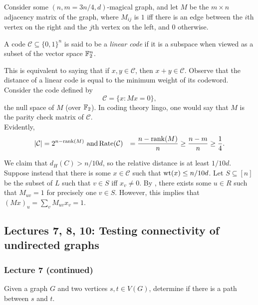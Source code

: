 			Consider some $(n,m=3n/4,d)$-magical graph, and let $M$ be the $m\times n$ adjacency matrix of the graph, where $M_{ij}$ is $1$ iff there is an edge between the $i$th vertex on the right and the $j$th vertex on the left, and $0$ otherwise.\\

			\begin{fdef}
				A code $\mathcal{C} \subseteq \{0,1\}^n$ is said to be a \emph{linear code} if it is a subspace when viewed as a subset of the vector space $\mathbb{F}_2^n$.
			\end{fdef}
			This is equivalent to saying that if $x,y \in \mathcal{C}$, then $x+y \in \mathcal{C}$. Observe that the distance of a linear code is equal to the minimum weight of its codeword. \\

			Consider the code defined by
			\[ \mathcal{C} = \{ x : Mx = 0 \}, \]
			the null space of $M$ (over $\mathbb{F}_2$). In coding theory lingo, one would say that $M$ is the parity check matrix of $\mathcal{C}$.\\
			Evidently,
			\begin{align*}
				|\mathcal{C}| &= 2^{n - \operatorname{rank}(M)} \text{ and}
				\operatorname{Rate}(\mathcal{C}) &= \frac{n-\operatorname{rank}(M)}{n} \ge \frac{n-m}{n} \ge \frac{1}{4}.
			\end{align*}

			We claim that $d_H(C) > n/10d$, so the relative distance is at least $1/10d$. Suppose instead that there is some $x \in \mathcal{C}$ such that $\operatorname{wt}(x) \le n/10d$. Let $S \subseteq [n]$ be the subset of $L$ such that $v \in S$ iff $x_v \ne 0$. By , there exists some $u \in R$ such that $M_{uv} = 1$ for precisely one $v \in S$. However, this implies that $(Mx)_u = \sum_v M_{uv} x_{v} = 1$.

	\subsection{Lectures 7, 8, 10: Testing connectivity of undirected graphs}
		\label{subsec: connectivity}

		\subsubsection{Lecture 7 (continued)}

			\begin{problem*}
				Given a graph $G$ and two vertices $s,t \in V(G)$, determine if there is a path between $s$ and $t$.
			\end{problem*}

